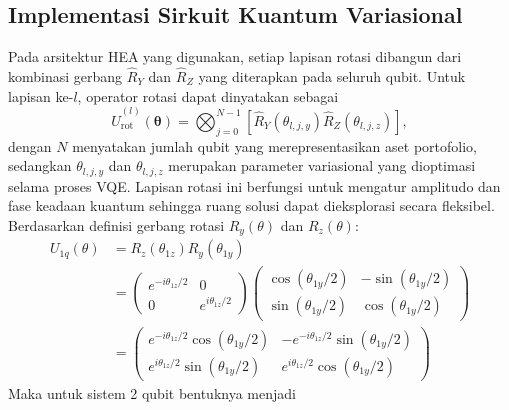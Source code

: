 \subsection{Implementasi Sirkuit Kuantum Variasional}
Pada arsitektur HEA yang digunakan, setiap lapisan rotasi dibangun dari kombinasi gerbang \(\hat{R}_Y\) dan \(\hat{R}_Z\) yang diterapkan pada seluruh qubit. Untuk lapisan ke-$l$, operator rotasi dapat dinyatakan sebagai
\begin{equation}
\hat{U}_{\mathrm{rot}}^{(l)}(\boldsymbol{\theta})
=
\bigotimes_{j=0}^{N-1}
\left[
\hat{R}_Y(\theta_{l,j,y})
\hat{R}_Z(\theta_{l,j,z})
\right],
\end{equation}
dengan \(N\) menyatakan jumlah qubit yang merepresentasikan aset portofolio, sedangkan \(\theta_{l,j,y}\) dan \(\theta_{l,j,z}\) merupakan parameter variasional yang dioptimasi selama proses VQE. Lapisan rotasi ini berfungsi untuk mengatur amplitudo dan fase keadaan kuantum sehingga ruang solusi dapat dieksplorasi secara fleksibel. Berdasarkan definisi gerbang rotasi $R_y(\theta)$ dan $R_z(\theta)$:
\begin{equation}
\begin{align}
U_{1q}(\theta) &= R_z(\theta_{1z}) R_y(\theta_{1y}) \\
&= \begin{pmatrix} e^{-i\theta_{1z}/2} & 0 \\ 0 & e^{i\theta_{1z}/2} \end{pmatrix} \begin{pmatrix} \cos(\theta_{1y}/2) & -\sin(\theta_{1y}/2) \\ \sin(\theta_{1y}/2) & \cos(\theta_{1y}/2) \end{pmatrix} \\
&= \begin{pmatrix} e^{-i\theta_{1z}/2} \cos(\theta_{1y}/2) & -e^{-i\theta_{1z}/2} \sin(\theta_{1y}/2) \\ e^{i\theta_{1z}/2} \sin(\theta_{1y}/2) & e^{i\theta_{1z}/2} \cos(\theta_{1y}/2) \end{pmatrix}
\end{align}
\end{equation}
Maka untuk sistem 2 qubit bentuknya menjadi

